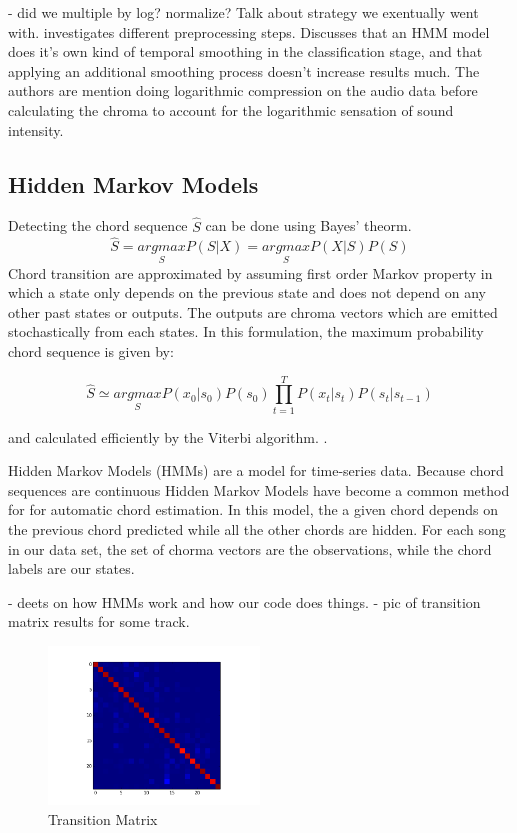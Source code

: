 \documentclass{article}
\begin{document}
- did we multiple by log? normalize? Talk about strategy we exentually went with.
\cite{Jiang:22} investigates different preprocessing steps. Discusses that
an HMM model does it's own kind of temporal smoothing in the classification
stage, and that applying an additional smoothing process doesn't increase results much.
The authors are mention doing logarithmic compression on the audio data before
calculating the chroma to account for the logarithmic sensation of sound intensity.

\subsection{Hidden Markov Models}

Detecting the chord sequence $\hat{S}$ can be done using Bayes' theorm.
$$\hat{S} = \underset{S}{argmax} P(S|X) = \underset{S}{argmax} P(X|S) P(S)$$
Chord transition are approximated by assuming first order Markov property in which a state only depends
on the previous state and does not depend on any other past states or outputs. The outputs are chroma
vectors which are emitted stochastically from each states. In this formulation, the maximum probability
chord sequence is given by:

$$\hat{S} \simeq  \underset{S}{argmax} P(x_{0}|s_{0}) P(s_{0}) \prod_{t=1}^{T} P(x_{t}|s_{t}) P(s_{t}|s_{t-1})$$

and calculated efficiently by the Viterbi algorithm. \cite{Ueda:01}.


Hidden Markov Models (HMMs) are a model for time-series data. Because chord sequences are continuous
Hidden Markov Models have become a common method for for automatic chord estimation. In this model, the
a given chord depends on the previous chord predicted while all the other chords are hidden. For each
song in our data set, the set of chorma vectors are the observations, while the chord labels are our states.

- deets on how HMMs work and how our code does things.
- pic of transition matrix results for some track.

\begin{figure}
   \centering
    \includegraphics[width=0.5\textwidth]{trans-h.png}
   \caption{Transition Matrix}
   \label{fig:trans-h}
\end{figure}
\end{document}
